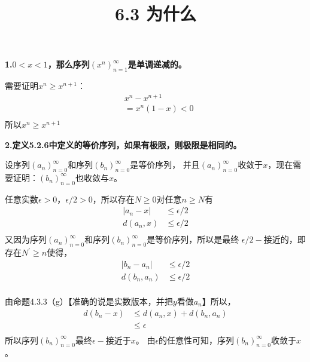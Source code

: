 \documentclass{article}
\theoremstyle{mystyle}
\begin{document}
\title{6.3 为什么}
\maketitle

\textbf{1.$0<x<1$，那么序列$(x^n)_{n=1}^\infty$是单调递减的。}

需要证明$x^n \geq x^{n+1}$：
\begin{align*}
   & x^n - x^{n+1}      \\
   & = x^n(1-x)     < 0 \\
\end{align*}
所以$x^n \geq x^{n+1}$

\textbf{2.定义5.2.6中定义的等价序列，如果有极限，则极限是相同的。}

设序列$(a_n)_{n=0}^\infty$和序列$(b_n)_{n=0}^\infty$是等价序列，
并且$(a_n)_{n=0}^\infty$收敛于$x$，现在需要证明：$(b_n)_{n=0}^\infty$也收敛与$x$。

任意实数$\epsilon > 0$，$\epsilon/2 > 0$，所以存在$N \geq 0$对任意$n \geq N$有
\begin{align*}
  |a_n - x| & \leq \epsilon / 2 \\
  d(a_n, x) & \leq \epsilon / 2 \\
\end{align*}
又因为序列$(a_n)_{n=0}^\infty$和序列$(b_n)_{n=0}^\infty$是等价序列，所以是最终
$\epsilon/2 -$接近的，即存在$N^\prime \geq n$使得，
\begin{align*}
  |b_n - a_n| & \leq \epsilon/2 \\
  d(b_n, a_n) & \leq \epsilon/2 \\
\end{align*}

由命题4.3.3（g）【准确的说是实数版本，并把$y$看做$a_n$】所以，
\begin{align*}
  d(b_n - x) & \leq d(a_n, x) + d(b_n, a_n) \\
             & \leq \epsilon                \\
\end{align*}
所以序列$(b_n)_{n=0}^\infty$最终$\epsilon -$接近于$x$。
由$\epsilon$的任意性可知，序列$(b_n)_{n=0}^\infty$收敛于$x$。
\end{document}
